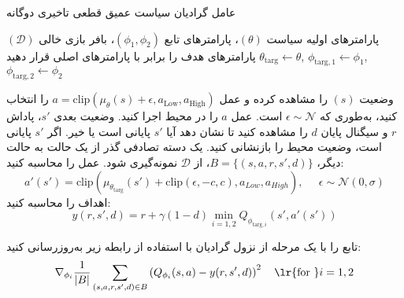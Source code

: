   \begin{algorithm}[H]
  	\caption{عامل گرادیان سیاست عمیق قطعی تاخیری دوگانه}\label{alg:TD3}
  	\begin{algorithmic}[1]
  		 پارامترهای اولیه سیاست
  		$(\theta)$، پارامترهای تابع
  		$(\phi_1, \phi_2)$،
  		 بافر بازی خالی $(\mathcal{D})$
  		\State پارامترهای هدف را برابر با پارامترهای اصلی قرار دهید
  		$\theta_{\text{targ}} \leftarrow \theta$,
  		 $\phi_{\text{targ}, 1} \leftarrow \phi_1$,
  		  $\phi_{\text{targ}, 2} \leftarrow \phi_2$
  		
  		\State 
  		وضعیت $(s)$ را مشاهده کرده و عمل 
  		$a = \text{clip}(\mu_{\theta}(s) + \epsilon, a_{\text{Low}}, a_{\text{High}})$
  		 را انتخاب کنید، به‌طوری که $\epsilon \sim \mathcal{N}$ است.
  		\State عمل $a$ را در محیط اجرا کنید.
  		\State 
  		وضعیت بعدی $s'$، پاداش $r$ و سیگنال پایان $d$ را مشاهده کنید تا نشان دهد آیا $s'$ پایانی است یا خیر.
  		\State اگر $s'$ پایانی است، وضعیت محیط را بازنشانی کنید.
  		\State یک دسته تصادفی گذر از ‌یک حالت به حالت دیگر، $B = \{ (s,a,r,s',d) \}$، از $\mathcal{D}$ نمونه‌گیری شود.
  		\State
  		عمل را محاسبه کنید:
  		\begin{equation*}
  			 a'(s') = \text{clip}\left(\mu_{\theta_{\text{targ}}}(s') + \text{clip}(\epsilon,-c,c), a_{Low}, a_{High}\right), \;\;\;\;\; \epsilon \sim \mathcal{N}(0, \sigma) 
  		\end{equation*}
  		\State
  		اهداف را محاسبه کنید:
  		\begin{equation*}
  			 y(r,s',d) = r + \gamma (1-d) \min_{i=1,2} Q_{\phi_{\text{targ},i}}(s', a'(s')) 
  		\end{equation*}
  		
  		\State تابع  را با یک مرحله از نزول گرادیان با استفاده از رابطه زیر به‌روزرسانی کنید:
  		\begin{align*} 
  			 \nabla_{\phi_i} \frac{1}{|B|}\sum_{(s,a,r,s',d) \in B} \left( Q_{\phi_i}(s,a) - y(r,s',d) \right)^2 
  			 \quad \text{\lr{for }}i=1,2 
  		\end{align*}
  		

\end{algorithmic}
\end{algorithm}
